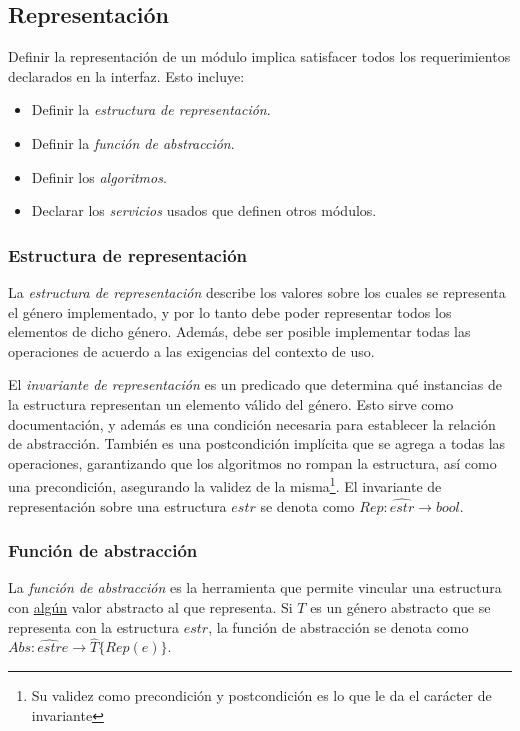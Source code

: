 \documentclass{article}
\begin{document}
\subsection{Representación}

Definir la representación de un módulo implica satisfacer todos los requerimientos declarados en la interfaz. Esto incluye:
\begin{itemize}
    \item Definir la \textit{estructura de representación}.
    \item Definir la \textit{función de abstracción}.
    \item Definir los \textit{algoritmos}.
    \item Declarar los \textit{servicios} usados que definen otros módulos.
\end{itemize}

\subsubsection{Estructura de representación}

La \textit{estructura de representación} describe los valores sobre los cuales se representa el género implementado, y por lo tanto debe poder representar todos los elementos de dicho género. Además, debe ser posible implementar todas las operaciones de acuerdo a las exigencias del contexto de uso.

El \textit{invariante de representación} es un predicado que determina qué instancias de la estructura representan un elemento válido del género. Esto sirve como documentación, y además es una condición necesaria para establecer la relación de abstracción. También es una postcondición implícita que se agrega a todas las operaciones, garantizando que los algoritmos no rompan la estructura, así como una precondición, asegurando la validez de la misma\footnote{Su validez como precondición y postcondición es lo que le da el carácter de invariante}. El invariante de representación sobre una estructura $estr$ se denota como $Rep: \hat{estr} \rightarrow bool$.

\subsubsection{Función de abstracción}

La \textit{función de abstracción} es la herramienta que permite vincular una estructura con \underline{algún} valor abstracto al que representa. Si $T$ es un género abstracto que se representa con la estructura $estr$, la función de abstracción se denota como $Abs: \hat{estr} e \rightarrow \hat{T} \{Rep(e)\}$.
\end{document}
